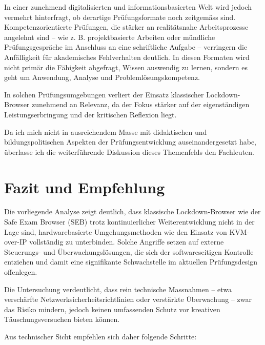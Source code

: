 \documentclass[14pt]{article}
\begin{document}
In einer zunehmend digitalisierten und informationsbasierten Welt wird jedoch vermehrt hinterfragt, ob derartige Prüfungsformate noch zeitgemäss sind. Kompetenzorientierte Prüfungen, die stärker an realitätsnahe Arbeitsprozesse angelehnt sind – wie z. B. projektbasierte Arbeiten oder mündliche Prüfungsgespräche im Anschluss an eine schriftliche Aufgabe – verringern die Anfälligkeit für akademisches Fehlverhalten deutlich. In diesen Formaten wird nicht primär die Fähigkeit abgefragt, Wissen auswendig zu lernen, sondern es geht um Anwendung, Analyse und Problemlösungskompetenz.

In solchen Prüfungsumgebungen verliert der Einsatz klassischer Lockdown-Browser zunehmend an Relevanz, da der Fokus stärker auf der eigenständigen Leistungserbringung und der kritischen Reflexion liegt.

Da ich mich nicht in ausreichendem Masse mit didaktischen und bildungspolitischen Aspekten der Prüfungsentwicklung auseinandergesetzt habe, überlasse ich die weiterführende Diskussion dieses Themenfelds den Fachleuten.

\section{Fazit und Empfehlung}

Die vorliegende Analyse zeigt deutlich, dass klassische Lockdown-Browser wie der Safe Exam Browser (SEB) trotz kontinuierlicher Weiterentwicklung nicht in der Lage sind, hardwarebasierte Umgehungsmethoden wie den Einsatz von KVM-over-IP vollständig zu unterbinden. Solche Angriffe setzen auf externe Steuerungs- und Überwachungslösungen, die sich der softwareseitigen Kontrolle entziehen und damit eine signifikante Schwachstelle im aktuellen Prüfungsdesign offenlegen.

Die Untersuchung verdeutlicht, dass rein technische Massnahmen – etwa verschärfte Netzwerksicherheitsrichtlinien oder verstärkte Überwachung – zwar das Risiko mindern, jedoch keinen umfassenden Schutz vor kreativen Täuschungsversuchen bieten können.

Aus technischer Sicht empfehlen sich daher folgende Schritte:
\end{document}
